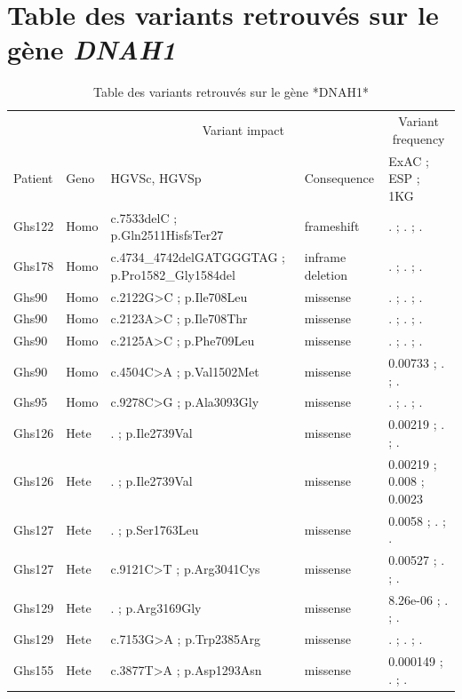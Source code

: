 \documentclass[12pt,twoside]{reedthesis}
\theoremstyle{definition}
\theoremstyle{definition}
\theoremstyle{remark}
\begin{document}
  \newpage
  
  \chapter{\texorpdfstring{Table des variants retrouvés sur le gène
  \emph{DNAH1}}{Table des variants retrouvés sur le gène DNAH1}}\label{table-des-variants-retrouves-sur-le-gene-dnah1}
  
  \begin{landscape}
  \begin{longtable}[t]{lllll}
  \caption{\label{tab:tabdnah1}Table des variants retrouvés sur le gène *DNAH1*}\\
  \toprule
  \multicolumn{2}{c}{ } & \multicolumn{2}{c}{Variant impact} & \multicolumn{1}{c}{Variant frequency} \\
  \cmidrule(l{2pt}r{2pt}){3-4} \cmidrule(l{2pt}r{2pt}){5-5}
  Patient & Geno & HGVSc, HGVSp & Consequence & ExAC ; ESP ; 1KG\\
  \midrule
  Ghs122 & Homo & c.7533delC ; p.Gln2511HisfsTer27 & frameshift & . ; . ; .\\
  Ghs178 & Homo & c.4734\_4742delGATGGGTAG ; p.Pro1582\_Gly1584del & inframe deletion & . ; . ; .\\
  Ghs90 & Homo & c.2122G>C ; p.Ile708Leu & missense & . ; . ; .\\
  Ghs90 & Homo & c.2123A>C ; p.Ile708Thr & missense & . ; . ; .\\
  Ghs90 & Homo & c.2125A>C ; p.Phe709Leu & missense & . ; . ; .\\
  \addlinespace
  Ghs90 & Homo & c.4504C>A ; p.Val1502Met & missense & 0.00733 ; . ; .\\
  Ghs95 & Homo & c.9278C>G ; p.Ala3093Gly & missense & . ; . ; .\\
  Ghs126 & Hete & . ; p.Ile2739Val & missense & 0.00219 ; . ; .\\
  Ghs126 & Hete & . ; p.Ile2739Val & missense & 0.00219 ; 0.008 ; 0.0023\\
  Ghs127 & Hete & . ; p.Ser1763Leu & missense & 0.0058 ; . ; .\\
  \addlinespace
  Ghs127 & Hete & c.9121C>T ; p.Arg3041Cys & missense & 0.00527 ; . ; .\\
  Ghs129 & Hete & . ; p.Arg3169Gly & missense & 8.26e-06 ; . ; .\\
  Ghs129 & Hete & c.7153G>A ; p.Trp2385Arg & missense & . ; . ; .\\
  Ghs155 & Hete & c.3877T>A ; p.Asp1293Asn & missense & 0.000149 ; . ; .\\

\end{longtable}
\end{landscape}
\end{document}
